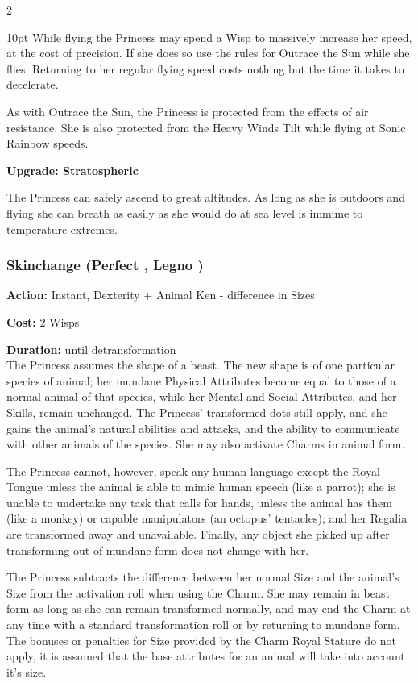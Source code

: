 \begin{multicols}{2}
\begin{myindentpar}{10pt}
While flying the Princess may spend a Wisp to massively increase her speed, at the cost of precision. If she does so use the rules for Outrace the Sun while she flies. Returning to her regular flying speed costs nothing but the time it takes to decelerate.

As with Outrace the Sun, the Princess is protected from the effects of air resistance. She is also protected from the Heavy Winds Tilt while flying at Sonic Rainbow speeds. 

\textbf{Upgrade: Stratospheric}

The Princess can safely ascend to great altitudes. As long as she is outdoors and flying she can breath as easily as she would do at sea level is immune to temperature extremes. 

\end{myindentpar}

\subsubsection*{Skinchange (Perfect \textbullet\textbullet\textbullet\textbullet, Legno  \textbullet\textbullet\textbullet)}

\noindent \textbf{Action:} Instant, Dexterity + Animal Ken - difference in Sizes

\noindent \textbf{Cost:} 2 Wisps

\noindent \textbf{Duration:} until detransformation \\

\noindent The Princess assumes the shape of a beast. The new shape is of one particular species of animal; her mundane Physical Attributes become equal to those of a normal animal of that species, while her Mental and Social Attributes, and her Skills, remain unchanged. The Princess' transformed dots still apply, and she gains the animal's natural abilities and attacks, and the ability to communicate with other animals of the species. She may also activate Charms in animal form.

The Princess cannot, however, speak any human language except the Royal Tongue unless the animal is able to mimic human speech (like a parrot); she is unable to undertake any task that calls for hands, unless the animal has them (like a monkey) or capable manipulators (an octopus' tentacles); and her Regalia are transformed away and unavailable. Finally, any object she picked up after transforming out of mundane form does not change with her.

The Princess subtracts the difference between her normal Size and the animal's Size from the activation roll when using the Charm. She may remain in beast form as long as she can remain transformed normally, and may end the Charm at any time with a standard transformation roll or by returning to mundane form. The bonuses or penalties for Size provided by the Charm Royal Stature do not apply, it is assumed that the base attributes for an animal will take into account it's size. 


\end{multicols}
